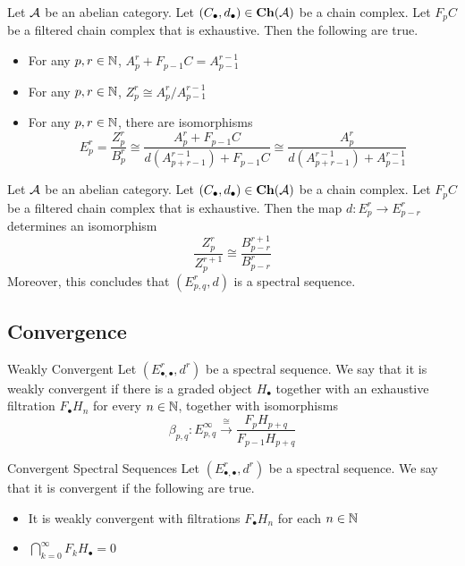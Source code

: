 \documentclass[a4paper]{article}
\begin{document}
\begin{lmm}{}{} Let $\mathcal{A}$ be an abelian category. Let $(C_\bullet,d_\bullet)\in\bold{Ch}(\mathcal{A})$ be a chain complex. Let $F_pC$ be a filtered chain complex that is exhaustive. Then the following are true. 
\begin{itemize}
\item For any $p,r\in\mathbb{N}$, $A_p^r+F_{p-1}C=A_{p-1}^{r-1}$
\item For any $p,r\in\mathbb{N}$, $Z_p^r\cong A_p^r/A_{p-1}^{r-1}$
\item For any $p,r\in\mathbb{N}$, there are isomorphisms $$E_p^r=\frac{Z_p^r}{B_p^r}\cong\frac{A_p^r+F_{p-1}C}{d(A_{p+r-1}^{r-1})+F_{p-1}C}\cong\frac{A_p^r}{d(A_{p+r-1}^{r-1})+A_{p-1}^{r-1}}$$
\end{itemize}
\end{lmm}

\begin{thm}{}{} Let $\mathcal{A}$ be an abelian category. Let $(C_\bullet,d_\bullet)\in\bold{Ch}(\mathcal{A})$ be a chain complex. Let $F_pC$ be a filtered chain complex that is exhaustive. Then the map $d:E_p^r\to E_{p-r}^r$ determines an isomorphism $$\frac{Z_p^r}{Z_p^{r+1}}\cong\frac{B_{p-r}^{r+1}}{B_{p-r}^r}$$ Moreover, this concludes that $(E_{p,q}^r,d)$ is a spectral sequence. 
\end{thm}

\subsection{Convergence}
\begin{defn}{Weakly Convergent}{} Let $(E_{\bullet,\bullet}^r,d^r)$ be a spectral sequence. We say that it is weakly convergent if there is a graded object $H_\bullet$ together with an exhaustive filtration $F_\bullet H_n$ for every $n\in\mathbb{N}$, together with isomorphisms $$\beta_{p,q}:E_{p,q}^\infty\overset{\cong}{\longrightarrow}\frac{F_pH_{p+q}}{F_{p-1}H_{p+q}}$$
\end{defn}

\begin{defn}{Convergent Spectral Sequences}{} Let $(E_{\bullet,\bullet}^r,d^r)$ be a spectral sequence. We say that it is convergent if the following are true. 
\begin{itemize}
\item It is weakly convergent with filtrations $F_\bullet H_n$ for each $n\in\mathbb{N}$
\item $\bigcap_{k=0}^\infty F_kH_\bullet=0$
\end{itemize}
\end{defn}
\end{document}
